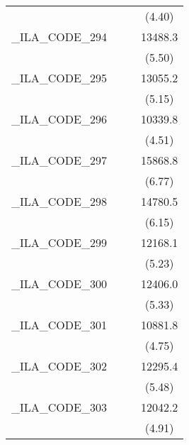{\begin{tabular}{l*{3}{c}}
            &                     &                     &      (4.40)         \\
[1em]
\_ILA\_CODE\_294&                     &                     &     13488.3\sym{***}\\
            &                     &                     &      (5.50)         \\
[1em]
\_ILA\_CODE\_295&                     &                     &     13055.2\sym{***}\\
            &                     &                     &      (5.15)         \\
[1em]
\_ILA\_CODE\_296&                     &                     &     10339.8\sym{***}\\
            &                     &                     &      (4.51)         \\
[1em]
\_ILA\_CODE\_297&                     &                     &     15868.8\sym{***}\\
            &                     &                     &      (6.77)         \\
[1em]
\_ILA\_CODE\_298&                     &                     &     14780.5\sym{***}\\
            &                     &                     &      (6.15)         \\
[1em]
\_ILA\_CODE\_299&                     &                     &     12168.1\sym{***}\\
            &                     &                     &      (5.23)         \\
[1em]
\_ILA\_CODE\_300&                     &                     &     12406.0\sym{***}\\
            &                     &                     &      (5.33)         \\
[1em]
\_ILA\_CODE\_301&                     &                     &     10881.8\sym{***}\\
            &                     &                     &      (4.75)         \\
[1em]
\_ILA\_CODE\_302&                     &                     &     12295.4\sym{***}\\
            &                     &                     &      (5.48)         \\
[1em]
\_ILA\_CODE\_303&                     &                     &     12042.2\sym{***}\\
            &                     &                     &      (4.91)         \\

\end{tabular}}
